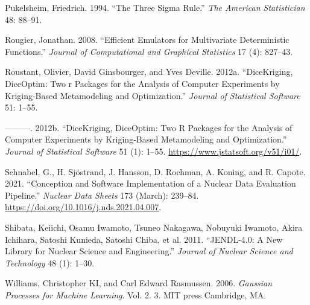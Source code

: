 \documentclass[
  12pt,
  a4paper,
  twoside]{book}
\newlength{\cslhangindent}
\newlength{\cslentryspacingunit} %
\newenvironment{CSLReferences}[2] %
 {%
  \setlength{\parindent}{0pt}
  \ifodd #1
  \let\oldpar\par
  \def\par{\hangindent=\cslhangindent\oldpar}
  \fi
  \setlength{\parskip}{#2\cslentryspacingunit}
 }%
 {}
\begin{document}
\begin{CSLReferences}{1}{0}
\leavevmode{}%
Pukelsheim, Friedrich. 1994. {``The Three Sigma Rule.''} \emph{The American Statistician} 48: 88--91.

\leavevmode{}%
Rougier, Jonathan. 2008. {``Efficient Emulators for Multivariate Deterministic Functions.''} \emph{Journal of Computational and Graphical Statistics} 17 (4): 827--43.

\leavevmode{}%
Roustant, Olivier, David Ginsbourger, and Yves Deville. 2012a. {``DiceKriging, DiceOptim: Two r Packages for the Analysis of Computer Experiments by Kriging-Based Metamodeling and Optimization.''} \emph{Journal of Statistical Software} 51: 1--55.

\leavevmode{}%
---------. 2012b. {``{DiceKriging}, {DiceOptim}: Two {R} Packages for the Analysis of Computer Experiments by Kriging-Based Metamodeling and Optimization.''} \emph{Journal of Statistical Software} 51 (1): 1--55. \url{https://www.jstatsoft.org/v51/i01/}.

\leavevmode{}%
Schnabel, G., H. Sjöstrand, J. Hansson, D. Rochman, A. Koning, and R. Capote. 2021. {``Conception and Software Implementation of a Nuclear Data Evaluation Pipeline.''} \emph{Nuclear Data Sheets} 173 (March): 239--84. \url{https://doi.org/10.1016/j.nds.2021.04.007}.

\leavevmode{}%
Shibata, Keiichi, Osamu Iwamoto, Tsuneo Nakagawa, Nobuyuki Iwamoto, Akira Ichihara, Satoshi Kunieda, Satoshi Chiba, et al. 2011. {``JENDL-4.0: A New Library for Nuclear Science and Engineering.''} \emph{Journal of Nuclear Science and Technology} 48 (1): 1--30.

\leavevmode{}%
Williams, Christopher KI, and Carl Edward Rasmussen. 2006. \emph{Gaussian Processes for Machine Learning}. Vol. 2. 3. MIT press Cambridge, MA.

\end{CSLReferences}
\end{document}
